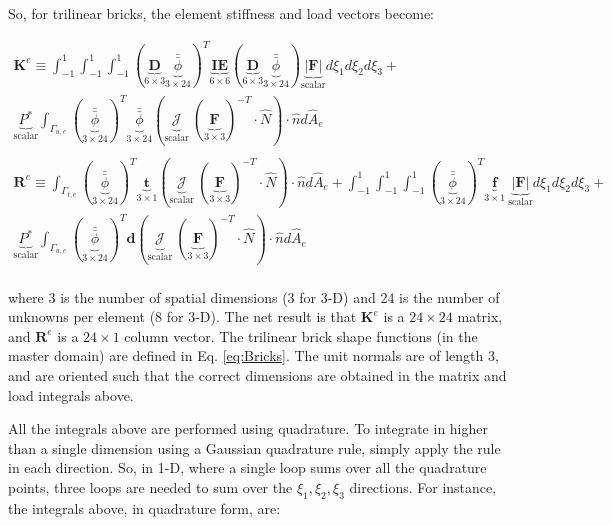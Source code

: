 \documentclass[10pt]{article}
\begin{document}
So, for trilinear bricks, the element stiffness and load vectors become:

\begin{tcolorbox}
\begin{equation}
\label{eq:FEWeakForm_element2}
\begin{aligned}
\textbf{K}^e\equiv\int_{-1}^{1}\int_{-1}^{1}\int_{-1}^{1}(\underbrace{\textbf{D}}_{6\times3}\underbrace{\bar{\bar{\phi}}}_{3\times24})^T\underbrace{\textbf{IE}}_{6\times6}(\underbrace{\textbf{D}}_{6\times3}\underbrace{\bar{\bar{\phi}}}_{3\times24})\underbrace{|\textbf{F}|}_\text{scalar}d\xi_1d\xi_2d\xi_3 +\quad\\
\underbrace{P^{*}}_\text{scalar}\int_{\Gamma_{u,e}}(\underbrace{\bar{\bar{\phi}}}_{3\times24})^T\underbrace{\bar{\bar{\phi}}}_{3\times24}(\underbrace{\mathscr{J}}_\text{scalar}\ (\underbrace{\textbf{F}}_{3\times3})^{-T}\cdot\hat{N})\cdot\hat{n}d\hat{A}_e\\
\ \\
\textbf{R}^e\equiv\int_{\Gamma_{t,e}}(\underbrace{\bar{\bar{\phi}}}_{3\times24})^T\underbrace{\textbf{t}}_{3\times1}(\underbrace{\mathscr{J}}_\text{scalar}\ (\underbrace{\textbf{F}}_{3\times3})^{-T}\cdot\hat{N})\cdot\hat{n}d\hat{A}_e+\int_{-1}^{1}\int_{-1}^{1}\int_{-1}^{1}(\underbrace{\bar{\bar{\phi}}}_{3\times24})^T\underbrace{\textbf{f}}_{3\times1}\ \underbrace{|\textbf{F}|}_\text{scalar}d\xi_1d\xi_2d\xi_3+\quad\\
\underbrace{P^{*}}_\text{scalar}\int_{\Gamma_{u,e}}(\underbrace{\bar{\bar{\phi}}}_{3\times24})^T\textbf{d}(\underbrace{\mathscr{J}}_\text{scalar}\ (\underbrace{\textbf{F}}_{3\times3})^{-T}\cdot\hat{N})\cdot\hat{n}d\hat{A}_e\\
\end{aligned}
\end{equation}
\end{tcolorbox}

where \(3\) is the number of spatial dimensions (3 for 3-D) and \(24\) is the number of unknowns per element (8 for 3-D). The net result is that \(\textbf{K}^e\) is a \(24\times24\) matrix, and \(\textbf{R}^e\) is a \(24\times1\) column vector. The trilinear brick shape functions (in the master domain) are defined in Eq. \eqref{eq:Bricks}. The unit normals are of length 3, and are oriented such that the correct dimensions are obtained in the matrix and load integrals above.

All the integrals above are performed using quadrature. To integrate in higher than a single dimension using a Gaussian quadrature rule, simply apply the rule in each direction. So, in 1-D, where a single loop sums over all the quadrature points, three loops are needed to sum over the \(\xi_1,\xi_2,\xi_3\) directions. For instance, the integrals above, in quadrature form, are:
\end{document}

